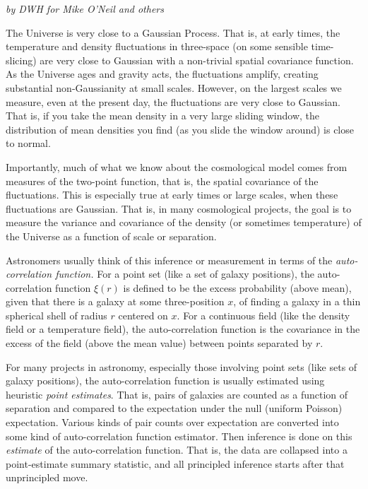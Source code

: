\documentclass[12pt]{article}
\begin{document}
\sloppy\sloppypar

\noindent
\textsl{by DWH for Mike O'Neil and others}
\medskip

The Universe is very close to a Gaussian Process.
That is, at early times, the temperature and density fluctuations in three-space
  (on some sensible time-slicing)
  are very close to Gaussian with a non-trivial spatial covariance function.
As the Universe ages and gravity acts, the fluctuations amplify,
  creating substantial non-Gaussianity at small scales.
However, on the largest scales we measure,
  even at the present day,
  the fluctuations are very close to Gaussian.
That is, if you take the mean density in a very large sliding window,
  the distribution of mean densities you find (as you slide the window around) is close to normal.

Importantly, much of what we know about the cosmological model
  comes from measures of the two-point function,
  that is, the spatial covariance of the fluctuations.
This is especially true at early times or large scales,
  when these fluctuations are Gaussian.
That is, in many cosmological projects,
  the goal is to measure the variance and covariance
  of the density (or sometimes temperature)
  of the Universe as a function of scale or separation.

Astronomers usually think of this inference or measurement
  in terms of the \emph{auto-correlation function.}
For a point set (like a set of galaxy positions),
  the auto-correlation function $\xi(r)$ is defined to be
  the excess probability (above mean), given that there is a galaxy at some three-position $x$,
  of finding a galaxy in a thin spherical shell of radius $r$ centered on $x$.
For a continuous field (like the density field or a temperature field),
  the auto-correlation function is the covariance in the excess of the field (above the mean value)
  between points separated by $r$.

For many projects in astronomy, especially those involving point sets (like sets of galaxy positions),
  the auto-correlation function is usually estimated using heuristic \emph{point estimates}.
That is, pairs of galaxies are counted as a function of separation
  and compared to the expectation under the null (uniform Poisson) expectation.
Various kinds of pair counts over expectation are converted into
  some kind of auto-correlation function estimator.
Then inference is done on this \emph{estimate} of the auto-correlation function.
That is, the data are collapsed into a point-estimate summary statistic,
  and all principled inference starts after that unprincipled move.
\end{document}
